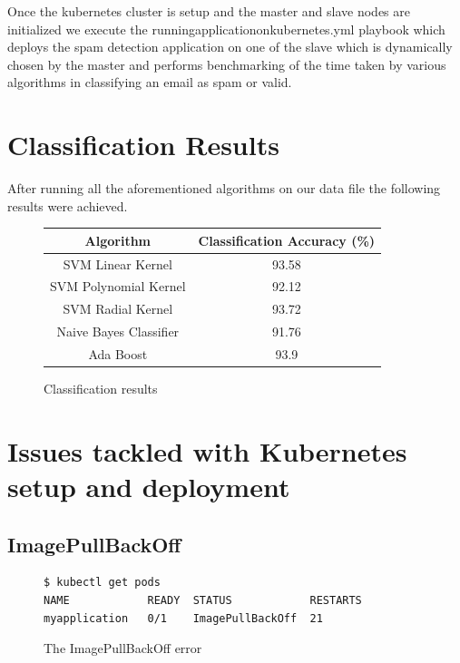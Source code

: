 \documentclass[9pt,twocolumn,twoside]{../../styles/osajnl}
\begin{document}
\noindent
Once the kubernetes cluster is setup and the master and slave nodes
are initialized we execute the runningapplicationonkubernetes.yml
playbook which deploys the spam detection application on one of the
slave which is dynamically chosen by the master and performs
benchmarking of the time taken by various algorithms in classifying an
email as spam or valid.

\section{Classification Results}

After running all the aforementioned algorithms on our data file the
following results were achieved.

\begin{figure}[ht]
\begin{center}
 \begin{tabular}{|c | c|} 
 \hline
Algorithm  & Classification Accuracy (\%) \\ [0.5ex] 
 \hline\hline
    
SVM Linear Kernel & 93.58 \\
\hline

SVM Polynomial Kernel & 92.12 \\
\hline

SVM Radial Kernel & 93.72 \\[1ex]
\hline

Naive Bayes Classifier & 91.76 \\[1ex]

\hline
Ada Boost  & 93.9 \\[1ex]
\hline

\end{tabular}
\end{center}
  \caption{Classification results}
\end{figure}


\section{Issues tackled with Kubernetes setup and deployment}

\subsection{ImagePullBackOff}

\begin{figure}[H]
\begin{verbatim}
$ kubectl get pods
NAME            READY  STATUS            RESTARTS  
myapplication   0/1    ImagePullBackOff  21         
\end{verbatim}
\caption{The ImagePullBackOff error}
\vspace{-3mm}
\label{The ImagePullBackOff error}
\end{figure}
\end{document}

